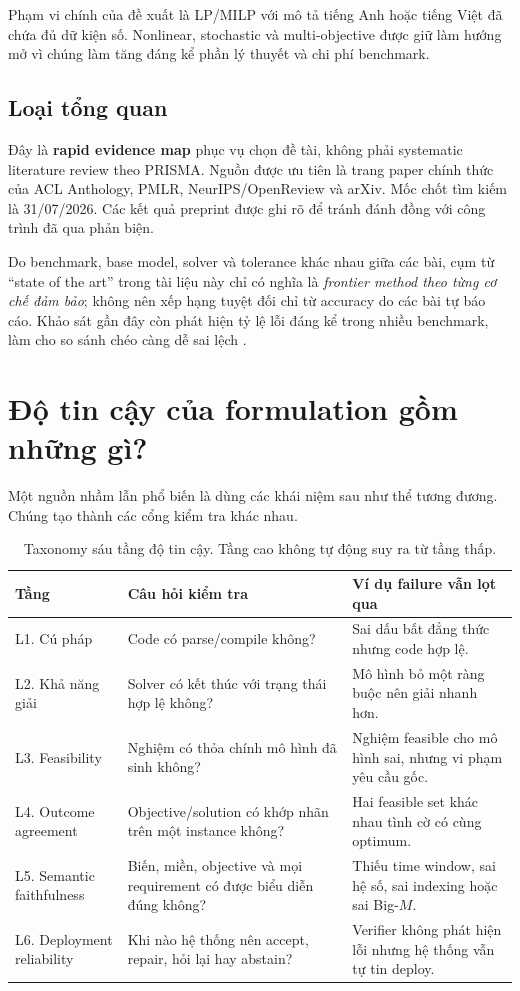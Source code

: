 \documentclass[11pt,a4paper]{article}
\begin{document}
Phạm vi chính của đề xuất là LP/MILP với mô tả tiếng Anh hoặc tiếng Việt đã chứa đủ dữ kiện số. Nonlinear, stochastic và multi-objective được giữ làm hướng mở vì chúng làm tăng đáng kể phần lý thuyết và chi phí benchmark.

\subsection{Loại tổng quan}

Đây là \textbf{rapid evidence map} phục vụ chọn đề tài, không phải systematic literature review theo PRISMA. Nguồn được ưu tiên là trang paper chính thức của ACL Anthology, PMLR, NeurIPS/OpenReview và arXiv. Mốc chốt tìm kiếm là 31/07/2026. Các kết quả preprint được ghi rõ để tránh đánh đồng với công trình đã qua phản biện.

Do benchmark, base model, solver và tolerance khác nhau giữa các bài, cụm từ ``state of the art'' trong tài liệu này chỉ có nghĩa là \emph{frontier method theo từng cơ chế đảm bảo}; không nên xếp hạng tuyệt đối chỉ từ accuracy do các bài tự báo cáo. Khảo sát gần đây còn phát hiện tỷ lệ lỗi đáng kể trong nhiều benchmark, làm cho so sánh chéo càng dễ sai lệch \parencite{xiao2025survey}.

\section{Độ tin cậy của formulation gồm những gì?}

Một nguồn nhầm lẫn phổ biến là dùng các khái niệm sau như thể tương đương. Chúng tạo thành các cổng kiểm tra khác nhau.

\begin{table}[htbp]
\centering
\caption{Taxonomy sáu tầng độ tin cậy. Tầng cao không tự động suy ra từ tầng thấp.}
\label{tab:reliability-levels}
\small
\begin{tabularx}{\textwidth}{L{2.5cm} Y Y}
\toprule
\textbf{Tầng} & \textbf{Câu hỏi kiểm tra} & \textbf{Ví dụ failure vẫn lọt qua} \\
\midrule
L1. Cú pháp & Code có parse/compile không? & Sai dấu bất đẳng thức nhưng code hợp lệ. \\
L2. Khả năng giải & Solver có kết thúc với trạng thái hợp lệ không? & Mô hình bỏ một ràng buộc nên giải nhanh hơn. \\
L3. Feasibility & Nghiệm có thỏa chính mô hình đã sinh không? & Nghiệm feasible cho mô hình sai, nhưng vi phạm yêu cầu gốc. \\
L4. Outcome agreement & Objective/solution có khớp nhãn trên một instance không? & Hai feasible set khác nhau tình cờ có cùng optimum. \\
L5. Semantic faithfulness & Biến, miền, objective và mọi requirement có được biểu diễn đúng không? & Thiếu time window, sai hệ số, sai indexing hoặc sai Big-\(M\). \\
L6. Deployment reliability & Khi nào hệ thống nên accept, repair, hỏi lại hay abstain? & Verifier không phát hiện lỗi nhưng hệ thống vẫn tự tin deploy. \\
\bottomrule
\end{tabularx}
\end{table}
\end{document}
